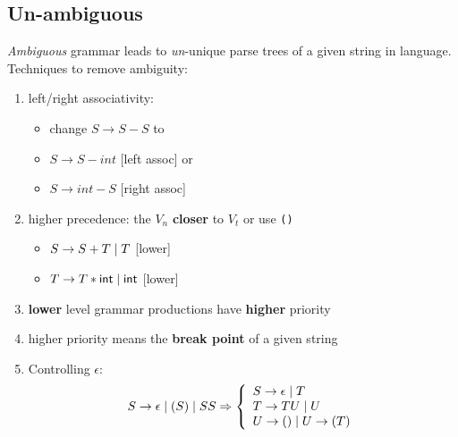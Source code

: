 \documentclass[10pt,a4paper,landscape]{article}
\begin{document}
\begin{multicols*}{3}
\section*{Un-ambiguous}
\emph{Ambiguous} grammar leads to \emph{un}-unique parse trees of a given string in language.  Techniques to remove ambiguity:
\begin{enumerate}
\item left/right associativity:
  \begin{itemize}
    \item[] change \(S \rightarrow S - S\) to
    \item \(S \rightarrow S - int\) [left assoc] or
    \item \(S \rightarrow int - S\) [right assoc]
  \end{itemize}
\item higher precedence: the \(V_{n}\) \textbf{closer} to \(V_{t}\) or use \verb|()|
  \begin{itemize}
    \item \(S \rightarrow S + T \;|\; T\) [lower]
    \item \(T \rightarrow T * \mathsf{int} \;|\; \mathsf{int}\) [lower]
    \end{itemize}
  \item[] \textbf{lower} level grammar productions have \textbf{higher} priority
  \item[] higher priority means the \textbf{break point} of a given string

\item Controlling \(\epsilon\):
  \vspace{-\baselineskip}
  \[
    S \rightarrow \epsilon \;|\; (S) \;|\; SS \Rightarrow\left\{
        \begin{array}{l}
          S \rightarrow \epsilon \;|\; T\\
          T \rightarrow TU \;|\; U\\
          U \rightarrow () \;|\; U \rightarrow (T)
        \end{array}
      \right.
  \]
  \vspace{-\baselineskip}
\end{enumerate}

\end{multicols*}
\end{document}
